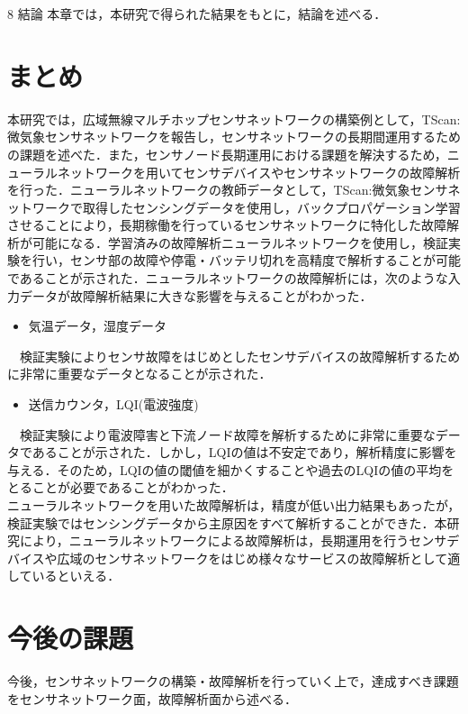 \chapterhead
{8}
{結論}
{本章では，本研究で得られた結果をもとに，結論を述べる．}

\section{まとめ}
本研究では，広域無線マルチホップセンサネットワークの構築例として，TScan:微気象センサネットワークを報告し，センサネットワークの長期間運用するための課題を述べた．また，センサノード長期運用における課題を解決するため，ニューラルネットワークを用いてセンサデバイスやセンサネットワークの故障解析を行った．ニューラルネットワークの教師データとして，TScan:微気象センサネットワークで取得したセンシングデータを使用し，バックプロパゲーション学習させることにより，長期稼働を行っているセンサネットワークに特化した故障解析が可能になる．学習済みの故障解析ニューラルネットワークを使用し，検証実験を行い，センサ部の故障や停電・バッテリ切れを高精度で解析することが可能であることが示された．ニューラルネットワークの故障解析には，次のような入力データが故障解析結果に大きな影響を与えることがわかった．
\begin{itemize}
\item 気温データ，湿度データ
\end{itemize}
　検証実験によりセンサ故障をはじめとしたセンサデバイスの故障解析するために非常に重要なデータとなることが示された．
\begin{itemize}
\item 送信カウンタ，LQI(電波強度)
\end{itemize}
　検証実験により電波障害と下流ノード故障を解析するために非常に重要なデータであることが示された．しかし，LQIの値は不安定であり，解析精度に影響を与える．そのため，LQIの値の閾値を細かくすることや過去のLQIの値の平均をとることが必要であることがわかった．\\

ニューラルネットワークを用いた故障解析は，精度が低い出力結果もあったが，検証実験ではセンシングデータから主原因をすべて解析することができた．本研究により，ニューラルネットワークによる故障解析は，長期運用を行うセンサデバイスや広域のセンサネットワークをはじめ様々なサービスの故障解析として適しているといえる．

\newpage

\section{今後の課題}
今後，センサネットワークの構築・故障解析を行っていく上で，達成すべき課題をセンサネットワーク面，故障解析面から述べる．
